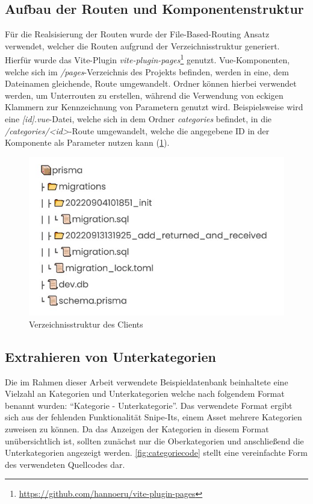 \subsection{Aufbau der Routen und Komponentenstruktur}
Für die Realsisierung der Routen wurde der File-Based-Routing Ansatz verwendet, welcher die Routen
aufgrund der Verzeichnisstruktur generiert. Hierfür wurde das Vite-Plugin
\textit{vite-plugin-pages}\footnote{\url{https://github.com/hannoeru/vite-plugin-pages}} genutzt.
Vue-Komponenten, welche sich im \textit{/pages}-Verzeichnis des Projekts befinden, werden in eine,
dem Dateinamen gleichende, Route umgewandelt. Ordner können hierbei verwendet werden, um Unterrouten
zu erstellen, während die Verwendung von eckigen Klammern zur Kennzeichnung von Parametern genutzt
wird. Beispielsweise wird eine \textit{[id].vue}-Datei, welche sich in dem Ordner
\textit{categories} befindet, in die \textit{/categories/<id>}-Route umgewandelt, welche die
angegebene ID in der Komponente als Parameter nutzen kann (\ref{fig:vue}).

\begin{figure}[h]
  \centering
  \includegraphics[scale=0.7]{Bilder/Db.jpg}
  \caption[Verzeichnisstruktur des Clients]{Verzeichnisstruktur des Clients}
  \label{fig:vue}
\end{figure}

\subsection{Extrahieren von Unterkategorien}
Die im Rahmen dieser Arbeit verwendete Beispieldatenbank beinhaltete eine Vielzahl an Kategorien und
Unterkategorien welche nach folgendem Format benannt wurden: \enquote{Kategorie - Unterkategorie}.
Das verwendete Format ergibt sich aus der fehlenden Funktionalität Snipe-Its, einem Asset mehrere
Kategorien zuweisen zu können. Da das Anzeigen der Kategorien in diesem Format unübersichtlich ist,
sollten zunächst nur die Oberkategorien und anschließend die Unterkategorien angezeigt werden.
\ref{fig:categoriecode} stellt eine vereinfachte Form des verwendeten Quellcodes dar.

